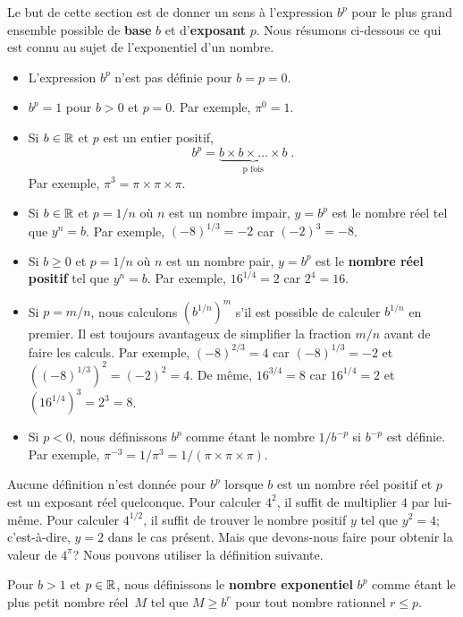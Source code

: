 {Le but de cette section est de donner un sens à l'expression $b^p$
pour le plus grand ensemble possible de {\bfseries base} $b$ et
d'{\bfseries exposant} $p$.  Nous résumons ci-dessous ce qui est connu
au sujet de l'exponentiel d'un nombre.

{\renewcommand{\labelitemi}{\textbullet}
\begin{itemize}
\item L'expression $b^p$ n'est pas définie pour $b=p=0$.
\item $b^p =1$ pour $b>0$ et $p=0$.  Par exemple, $\pi^0 = 1$.
\item Si $b \in \mathbb{R}$ et $p$ est un entier positif,
\[
b^{p} = \underbrace{b \times b \times \ldots \times b}_{\text{p fois}}
\; .
\]
Par exemple, $\pi^3 = \pi \times \pi \times \pi$.
\item Si $b \in \mathbb{R}$ et $p = 1/n$ où $n$ est un nombre impair, $y=b^p$
  est le nombre réel tel que $y^n = b$.  Par exemple,
  $(-8)^{1/3} = -2$ car $(-2)^3 = -8$.
\item Si $b \geq 0$ et $p = 1/n$ où $n$ est un nombre pair, $y=b^p$
  est le {\bfseries nombre réel positif} tel que $y^n = b$.  Par exemple,
  $16^{1/4} = 2$ car $2^4 = 16$.
\item Si $p = m/n$, nous calculons $\displaystyle \left(b^{1/n}\right)^m$
  s'il est possible de calculer $\displaystyle b^{1/n}$ en premier.
  Il est toujours avantageux de simplifier la fraction $m/n$ avant de
  faire les calculs.  Par exemple, $(-8)^{2/3} = 4$ car $(-8)^{1/3} = -2$ et
  $\displaystyle \left((-8)^{1/3}\right)^2 = (-2)^2 = 4$.  De même,
  $16^{3/4} = 8$ car $16^{1/4} =2$ et
  $\displaystyle \left(16^{1/4}\right)^3 = 2^3 = 8$.
\item Si $p<0$, nous définissons $b^p$ comme étant le nombre
  $1/b^{-p}$ si $b^{-p}$ est définie.  Par exemple,
  $\pi^{-3} = 1/\pi^3 = 1/(\pi \times \pi \times \pi)$.
\end{itemize}
}

Aucune définition n'est donnée pour $b^p$ lorsque $b$ est un nombre
réel positif et $p$ est un exposant réel quelconque.  Pour calculer
$4^2$, il suffit de multiplier $4$ par lui-même.  Pour calculer
$4^{1/2}$, il suffit de trouver le nombre positif $y$ tel que $y^2=4$;
c'est-à-dire, $y=2$ dans le cas présent.  Mais que devons-nous faire
pour obtenir la valeur de $4^\pi$?  Nous pouvons utiliser
la définition suivante.

\begin{defn} \label{pr_def_of_exp}
Pour $b >1$ et $p \in \mathbb{R}$, nous définissons le {\bfseries nombre exponentiel}
$b^p$ comme étant le plus petit nombre réel\footnotemark\ $M$ tel que
$M \geq  b^r$ pour tout nombre rationnel $r\leq p$.


\end{defn}}
